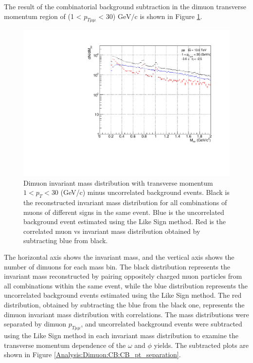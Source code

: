                 The result of the combinatorial background subtraction in the dimuon transverse momentum region of (1 < $p_{T\mu\mu}$ < 30) $\mathrm{GeV/c}$ is shown in Figure \ref{All_pt_CB}.
                \begin{figure}[H]
                    \centering
                    \includegraphics[keepaspectratio, scale=0.5]{fig/3_4_1_CB_pt_1to30.pdf}
                    \caption{Dimuon invariant mass distribution with transverse momentum $1< p_T <30$ (GeV/c) minus uncorrelated background events. Black is the reconstructed invariant mass distribution for all combinations of muons of different signs in the same event. Blue is the uncorrelated background event estimated using the Like Sign method. Red is the correlated muon vs invariant mass distribution obtained by subtracting blue from black.}
                    \label{All_pt_CB}
                \end{figure}
                The horizontal axis shows the invariant mass, and the vertical axis shows the number of dimuons for each mass bin. The black distribution represents the invariant mass reconstructed by pairing oppositely charged muon particles from all combinations within the same event, while the blue distribution represents the uncorrelated background events estimated using the Like Sign method. The red distribution, obtained by subtracting the blue from the black one, represents the dimuon invariant mass distribution with correlations.
                The mass distributions were separated by dimuon $p_{T\mu\mu}$, and uncorrelated background events were subtracted using the Like Sign method in each invariant mass distribution to examine the transverse momentum dependence of the $\omega$ and $\phi$ yields. The subtracted plots are shown in Figure \ref{Analysis:Dimuon:CB:CB_pt_separation}.

